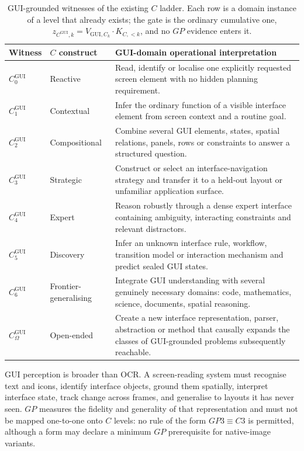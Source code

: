 \documentclass[11pt]{article}
\theoremstyle{definition}
\begin{document}
\begin{table}[!htbp]
\centering\small
\begin{tabularx}{\textwidth}{@{}llY@{}}
\toprule
Witness & $C$ construct & GUI-domain operational interpretation \\
\midrule
$C^{\mathrm{GUI}}_0$ & Reactive & Read, identify or localise one explicitly requested screen element with no hidden planning requirement. \\
$C^{\mathrm{GUI}}_1$ & Contextual & Infer the ordinary function of a visible interface element from screen context and a routine goal. \\
$C^{\mathrm{GUI}}_2$ & Compositional & Combine several GUI elements, states, spatial relations, panels, rows or constraints to answer a structured question. \\
$C^{\mathrm{GUI}}_3$ & Strategic & Construct or select an interface-navigation strategy and transfer it to a held-out layout or unfamiliar application surface. \\
$C^{\mathrm{GUI}}_4$ & Expert & Reason robustly through a dense expert interface containing ambiguity, interacting constraints and relevant distractors. \\
$C^{\mathrm{GUI}}_5$ & Discovery & Infer an unknown interface rule, workflow, transition model or interaction mechanism and predict sealed GUI states. \\
$C^{\mathrm{GUI}}_6$ & Frontier-generalising & Integrate GUI understanding with several genuinely necessary domains: code, mathematics, science, documents, spatial reasoning. \\
$C^{\mathrm{GUI}}_{\Omega}$ & Open-ended & Create a new interface representation, parser, abstraction or method that causally expands the classes of GUI-grounded problems subsequently reachable. \\
\bottomrule
\end{tabularx}
\caption{GUI-grounded witnesses of the existing $C$ ladder. Each row is a domain instance of a level that already exists; the gate is the ordinary cumulative one, $z_{C^{\mathrm{GUI}},k} = V_{\mathrm{GUI},C_k}\cdot K_{C,<k}$, and no $GP$ evidence enters it.}
\label{tab:cgui}
\end{table}

GUI perception is broader than OCR. A screen-reading system must recognise text and icons, identify interface objects, ground them spatially, interpret interface state, track change across frames, and generalise to layouts it has never seen. $GP$ measures the fidelity and generality of that representation and must not be mapped one-to-one onto $C$ levels: no rule of the form $GP3 \equiv C3$ is permitted, although a form may declare a minimum $GP$ prerequisite for native-image variants.
\end{document}
